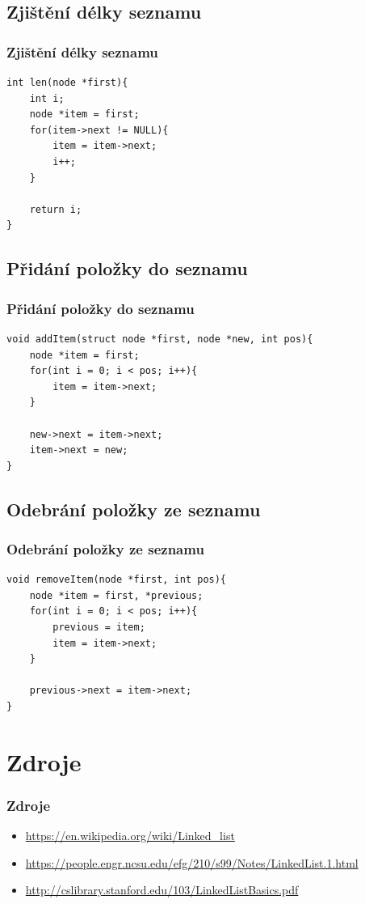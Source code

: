 \documentclass{beamer}
\begin{document}
\subsection{Zjištění délky seznamu}
\begin{frame}[fragile]
\frametitle{Zjištění délky seznamu}
\begin{verbatim}
int len(node *first){
    int i;
    node *item = first;
    for(item->next != NULL){
        item = item->next;
        i++;
    }
    
    return i;
}
\end{verbatim}
\end{frame}

\subsection{Přidání položky do seznamu}
\begin{frame}[fragile]
\frametitle{Přidání položky do seznamu}
\begin{verbatim}
void addItem(struct node *first, node *new, int pos){
    node *item = first;
    for(int i = 0; i < pos; i++){
        item = item->next;
    }
    
    new->next = item->next;
    item->next = new;
}
\end{verbatim}
\end{frame}

\subsection{Odebrání položky ze seznamu}
\begin{frame}[fragile]
\frametitle{Odebrání položky ze seznamu}
\begin{verbatim}
void removeItem(node *first, int pos){
    node *item = first, *previous;
    for(int i = 0; i < pos; i++){
        previous = item;
        item = item->next;
    }
    
    previous->next = item->next;
}
\end{verbatim}
\end{frame}

\section{Zdroje}
\begin{frame}
\frametitle{Zdroje}
\begin{itemize}
    \item \url{https://en.wikipedia.org/wiki/Linked_list}
    \item \url{https://people.engr.ncsu.edu/efg/210/s99/Notes/LinkedList.1.html}
    \item \url{http://cslibrary.stanford.edu/103/LinkedListBasics.pdf}
\end{itemize}
\end{frame}
\end{document}
